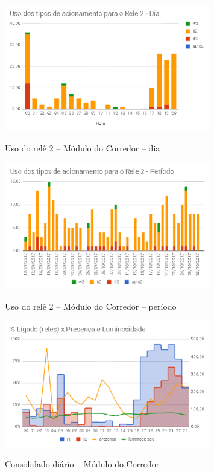 \begin{figure}[H]
	\centering
	\caption{Uso do relê 2 -- Módulo do Corredor -- dia}
	\includegraphics[width=0.8\textwidth]{usoRele2CorredorDia}
	\label{fig:usoRele2CorredorDia}
\end{figure}

\begin{figure}[H]
	\centering
	\caption{Uso do relê 2 -- Módulo do Corredor -- período}
	\includegraphics[width=0.8\textwidth]{UsoRele2CorredorPeriodo}
	\label{fig:UsoRele2CorredorPeriodo}
\end{figure}

\begin{figure}[H]
	\centering
	\caption{Consolidado diário -- Módulo do Corredor}
	\includegraphics[width=0.8\textwidth]{RelesTempLuminosidadeCorredor}
	\label{fig:RelesTempLuminosidadeCorredor}
\end{figure}

